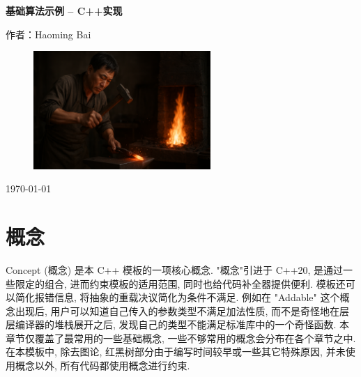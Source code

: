 \documentclass[a4paper]{ctexbook}
\begin{document}
\begin{titlepage}
	\centering
	\vspace*{2cm}


	{\Huge\bfseries 基础算法示例 -- C++实现\par}
	\vspace{2cm}
	{\Large 作者：Haoming Bai\par}
	\vfill

	\begin{figure}[h]
		\centering
		\includegraphics[width=0.6\textwidth]{./blacksimithing.png}
	\end{figure}
	\vfill

	{\large \today\par}
\end{titlepage}

\clearpage
{}
\tableofcontents
\clearpage

\mainmatter

\chapter{概念}

Concept (概念) 是本 C++ 模板的一项核心概念. "概念"引进于 C++20, 是通过一些限定的组合, 进而约束模板的适用范围, 同时也给代码补全器提供便利. 模板还可以简化报错信息, 将抽象的重载决议简化为条件不满足. 例如在 "Addable" 这个概念出现后, 用户可以知道自己传入的参数类型不满足加法性质, 而不是奇怪地在层层编译器的堆栈展开之后, 发现自己的类型不能满足标准库中的一个奇怪函数. 本章节仅覆盖了最常用的一些基础概念, 一些不够常用的概念会分布在各个章节之中. 在本模板中, 除去图论, 红黑树部分由于编写时间较早或一些其它特殊原因, 并未使用概念以外, 所有代码都使用概念进行约束.
\end{document}
